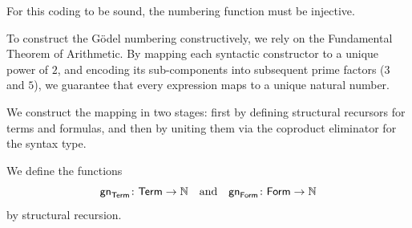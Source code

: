 For this coding to be sound, the numbering function must be injective.

To construct the G\"odel numbering constructively, we rely on the Fundamental Theorem of Arithmetic. By mapping each syntactic constructor to a unique power of $2$, and encoding its sub-components into subsequent prime factors ($3$ and $5$), we guarantee that every expression maps to a unique natural number.

We construct the mapping in two stages: first by defining structural recursors for terms and formulas, and then by uniting them via the coproduct eliminator for the syntax type.

\begin{defn}\label{defn:gn}
    We define the functions
    \[
        \fun{gn}_{\fun{Term}}\colon\fun{Term}\to\N
        \quad\text{and}\quad
        \fun{gn}_{\fun{Form}}\colon\fun{Form}\to\N
    \]
    by structural recursion. 
    

\end{defn}
